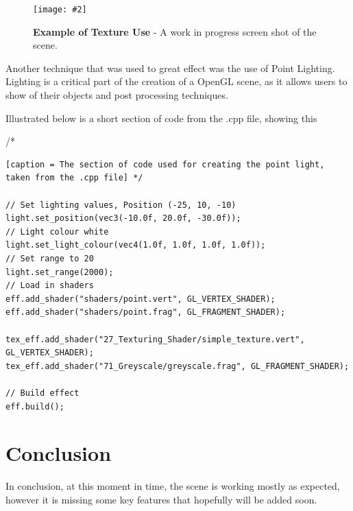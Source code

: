 \documentclass[10pt, a4paper]{article}
\newcommand{\figuremacro}[5]{
    \begin{figure}[#1]
        \centering
        \texttt{[image: \#2]}
        \caption[#3]{\textbf{#3}#4}
        \label{fig:#2}
    \end{figure}
}
\begin{document}
     \figuremacro{h}{pyramids}{Example of Texture Use}{ - A work in progress screen shot of the scene.}{1.0}
    
   Another technique that was used to great effect was the use of Point Lighting. Lighting is a critical part of the creation of a OpenGL scene, as it allows users to show of their objects and post processing techniques.
   
   Illustrated below is a short section of code from the .cpp file, showing this
    
/* \begin{lstlisting}[caption = The section of code used for creating the point light, taken from the .cpp file] */

// Set lighting values, Position (-25, 10, -10)
light.set_position(vec3(-10.0f, 20.0f, -30.0f));
// Light colour white
light.set_light_colour(vec4(1.0f, 1.0f, 1.0f, 1.0f));
// Set range to 20
light.set_range(2000);
// Load in shaders
eff.add_shader("shaders/point.vert", GL_VERTEX_SHADER);
eff.add_shader("shaders/point.frag", GL_FRAGMENT_SHADER);

tex_eff.add_shader("27_Texturing_Shader/simple_texture.vert", GL_VERTEX_SHADER);
tex_eff.add_shader("71_Greyscale/greyscale.frag", GL_FRAGMENT_SHADER);

// Build effect
eff.build();

\end{lstlisting}




	
\section{Conclusion}
In conclusion, at this moment in time, the scene is working mostly as expected, however it is missing some key features that hopefully will be added soon. 
	

		
\end{document}

